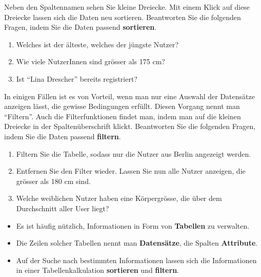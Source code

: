 \begin{myexercise}
    Neben den Spaltennamen sehen Sie kleine Dreiecke. Mit einem Klick auf diese Dreiecke lassen sich die Daten neu sortieren. Beantworten Sie die folgenden Fragen, indem Sie die Daten passend \textbf{sortieren}.

  \begin{enumerate}
      \item Welches ist der älteste, welches der jüngste Nutzer?
      \item Wie viele NutzerInnen sind grösser als 175 cm?
      \item Ist \enquote{Lina Drescher} bereits registriert?
      \setcounter{enumTemp}{\theenumi}
  \end{enumerate}

  In einigen Fällen ist es von Vorteil, wenn man nur eine Auswahl der Datensätze anzeigen lässt, die gewisse Bedingungen erfüllt. Diesen Vorgang nennt man \enquote{Filtern}. Auch die Filterfunktionen findet man, indem man auf die kleinen Dreiecke in der Spaltenüberschrift klickt. Beantworten Sie die folgenden Fragen, indem Sie die Daten passend \textbf{filtern}.

  \begin{enumerate}
    \setcounter{enumi}{\theenumTemp}
    \item Filtern Sie die Tabelle, sodass nur die Nutzer aus Berlin angezeigt werden.
    \item Entfernen Sie den Filter wieder. Lassen Sie nun alle Nutzer anzeigen, die grösser als 180 cm sind.
    \item Welche weiblichen Nutzer haben eine Körpergrösse, die über dem Durchschnitt aller User liegt?
  \end{enumerate}


\end{myexercise}


\begin{mysummary}

\begin{itemize}
  \item Es ist häufig nützlich, Informationen in Form von \textbf{Tabellen} zu verwalten.
  \item Die Zeilen solcher Tabellen nennt man \textbf{Datensätze}, die Spalten \textbf{Attribute}.
  \item Auf der Suche nach bestimmten Informationen lassen sich die Informationen in einer Tabellenkalkulation \textbf{sortieren} und \textbf{filtern}.
\end{itemize}
\end{mysummary}


